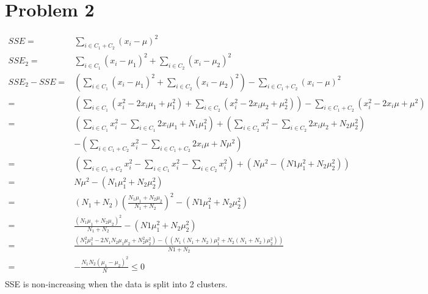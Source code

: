 \documentclass[11pt]{scrartcl}
\begin{document}
\section*{Problem 2}
\begin{equation*}
\begin{aligned}
SSE=&\sum_{i\in C_1+C_2}(x_i-\mu)^2\\
SSE_2=&\sum_{i\in C_1}(x_i-\mu_1)^2+\sum_{i\in C_2}(x_i-\mu_2)^2\\
SSE_2-SSE=&(\sum_{i\in C_1}(x_i-\mu_1)^2+\sum_{i\in C_2}(x_i-\mu_2)^2)-\sum_{i\in C_1+C_2}(x_i-\mu)^2\\
=&(\sum_{i\in C_1}(x_i^2-2x_i\mu_1+\mu_1^2)+\sum_{i\in C_2}(x_i^2-2x_i\mu_2+\mu_2^2))-\sum_{i\in C_1+C_2}(x_i^2-2x_i\mu+\mu^2)\\
=&(\sum_{i\in C_1}x_i^2-\sum_{i\in C_1}2x_i\mu_1+N_1 \mu_1^2)+(\sum_{i\in C_2}x_i^2-\sum_{i\in C_2}2x_i\mu_2+N_2 \mu_2^2)\\
&-(\sum_{i\in C_1+C_2}x_i^2-\sum_{i\in C_1+C_2}2x_i\mu+N\mu^2)\\
=&(\sum_{i\in C_1+C_2}x_i^2-\sum_{i\in C_1}x_i^2-\sum_{i\in C_2}x_i^2)+(N\mu^2-(N1 \mu_1^2+N_2\mu_2^2))\\
=&N\mu^2-(N_1 \mu_1^2+N_2\mu_2^2)\\
=&(N_1+N_2)(\frac{N_1\mu_1+N_2 \mu_2}{N_1+N_2})^2-(N1 \mu_1^2+N_2\mu_2^2)\\
=&\frac{(N_1 \mu_1 + N_2 \mu_2)^2}{N_1+N_2}-(N1 \mu_1^2+N_2\mu_2^2)\\
=&\frac{(N_1^2 \mu_1^2-2N_1N_2\mu_1\mu_2+N_2^2 \mu_2^2)-((N_1(N_1+N_2)\mu_1^2+N_2(N_1+N_2)\mu_2^2))}{N1+N_2}\\
=&-\frac{N_1 N_2 (\mu_1-\mu_2)^2}{N}\leq 0\\
\end{aligned}
\end{equation*}
SSE is non-increasing when the data is split into 2 clusters.
\end{document}
